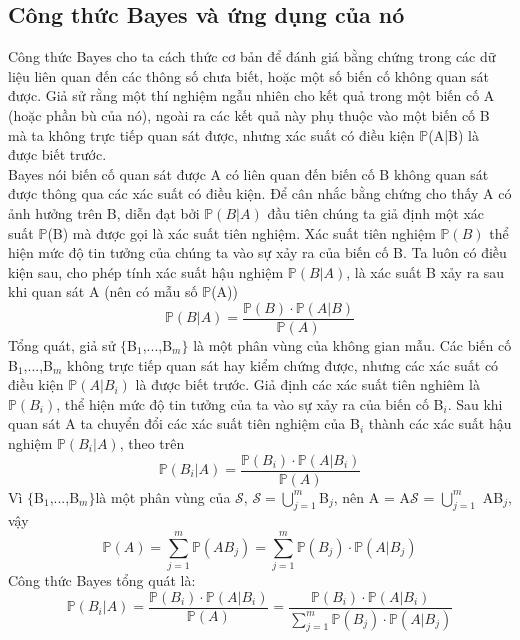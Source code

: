 \documentclass[a4paper, 13pt]{report}
\begin{document}
\subsection*{Công thức Bayes và ứng dụng của nó}
Công thức Bayes cho ta cách thức cơ bản để đánh giá bằng chứng trong các dữ liệu liên quan đến các thông số chưa biết, hoặc một số biến cố không quan sát được. Giả sử rằng một thí nghiệm ngẫu nhiên cho kết quả trong một biến cố A (hoặc phần bù của nó), ngoài ra các kết quả này phụ thuộc vào một biến cố B mà ta không trực tiếp quan sát được, nhưng xác suất có điều kiện $\mathbb{P}$(A|B) là được biết trước.\\
Bayes nói biến cố quan sát được A có liên quan đến biến cố B không quan sát được thông qua các xác suất có điều kiện. Để cân nhắc bằng chứng cho thấy A có ảnh hưởng trên B, diễn đạt bởi $\mathbb{P}(B|A)$ đầu tiên chúng ta giả định một xác suất $\mathbb{P}$(B) mà được gọi là xác suất tiên nghiệm. Xác suất tiên nghiệm $\mathbb{P}(B)$ thể hiện mức độ tin tưởng của chúng ta vào sự xảy ra của biến cố B. Ta luôn có điều kiện sau, cho phép tính xác suất hậu nghiệm $\mathbb{P}(B|A)$, là xác suất B xảy ra sau khi quan sát A (nên có mẫu số $\mathbb{P}$(A))\\
\[
\mathbb{P}(B|A) = \frac{\mathbb{P}(B) \cdot \mathbb{P}(A|B)}{\mathbb{P}(A)}
\]
Tổng quát, giả sử $\{$B$_1$,...,B$_m\}$ là một phân vùng của không gian mẫu. Các biến cố B$_1$,...,B$_m$ không trực tiếp quan sát hay kiểm chứng được, nhưng các xác suất có điều kiện $\mathbb{P}(A|B_i)$ là được biết trước. Giả định các xác suất tiên nghiêm là $\mathbb{P}(B_i)$, thể hiện mức độ tin tưởng của ta vào sự xảy ra của biến cố B$_i$. Sau khi quan sát A ta chuyển đổi các xác suất tiên nghiệm của B$_{i}$ thành các xác suất hậu nghiệm $\mathbb{P}(B_i|A)$, theo trên\\
\[
\mathbb{P}(B_i|A) = \frac{\mathbb{P}(B_i) \cdot \mathbb{P}(A|B_i)}{\mathbb{P}(A)}
\]
Vì $\{$B$_1$,...,B$_m\}$là một phân vùng 	của $\mathcal{S}$, $\mathcal{S}=\bigcup_{j=1}^m $B$_j$, nên A = A$\mathcal{S}$ = $\bigcup_{j=1}^m$ AB$_j$, vậy\\
\[
\mathbb{P}(A)=\sum_{j=1}^m \mathbb{P}(AB_j) = \sum_{j=1}^m \mathbb{P}(B_j)\cdot \mathbb{P}(A|B_j)
\]
Công thức Bayes tổng quát là:\\
\[ %
  \mathbb{P}(B_{i}|A)= \dfrac{\mathbb{P}(B_{i})\cdot \mathbb{P}(A|B_{i})}{\mathbb{P}(A)}
            =\dfrac{\mathbb{P}(B_{i})\cdot \mathbb{P}(A|B_{i})}{\sum_{j=1}^{m} \mathbb{P}(B_j) \cdot \mathbb{P}(A|B_j)}
\]
\end{document}
